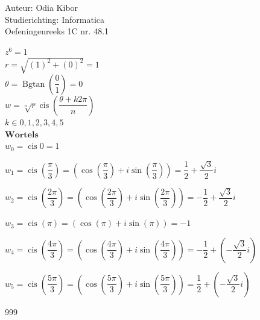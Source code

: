 \documentclass[a4paper]{article}
\begin{document}
  
\noindent \large Auteur: Odia Kibor \\
\noindent \large Studierichting: Informatica\\
\noindent \large Oefeningenreeks 1C nr. 48.1\\

\medskip

\normalsize

$ z^6 = 1$\\

$ r = \sqrt{(1)^2 + (0)^2} = 1$\\

$ \theta = \operatorname{Bgtan}\left (\dfrac{0}{1} \right) =0$\\

$ w = \sqrt[n]{r} \operatorname{cis} \left( \dfrac{\theta + k 2 \pi}{n} \right)$\\

$k \in {0,1,2,3,4,5}$\\

$\textbf{Wortels}$\\

$w_0 = \operatorname{cis}0 = 1$

$w_1 = \operatorname{cis} \left(\dfrac{\pi}{3}\right) = \left(\cos \left(\dfrac{\pi}{3}\right) + i \sin \left(\dfrac{\pi}{3}\right)\right) = \dfrac{1}{2} + \dfrac{\sqrt{3}}{2}i$

$w_2 = \operatorname{cis} \left(\dfrac{2\pi}{3}\right) = \left(\cos \left(\dfrac{2\pi}{3}\right) + i \sin \left(\dfrac{2\pi}{3}\right)\right) = -\dfrac{1}{2} + \dfrac{\sqrt{3}}{2}i$

$w_3 = \operatorname{cis} \left(\pi\right) = \left(\cos \left(\pi\right) + i \sin \left(\pi\right)\right) = -1$

$w_4 = \operatorname{cis} \left(\dfrac{4\pi}{3}\right) = \left(\cos \left(\dfrac{4\pi}{3}\right) + i \sin \left(\dfrac{4\pi}{3}\right)\right) = -\dfrac{1}{2} + \left( -\dfrac{\sqrt{3}}{2}i\right)$

$w_5 = \operatorname{cis} \left(\dfrac{5\pi}{3}\right) = \left(\cos \left(\dfrac{5\pi}{3}\right) + i \sin \left(\dfrac{5\pi}{3}\right)\right) = \dfrac{1}{2} + \left( -\dfrac{\sqrt{3}}{2}i\right)$











\begin{thebibliography}{999}
\end{thebibliography}
\end{document}
